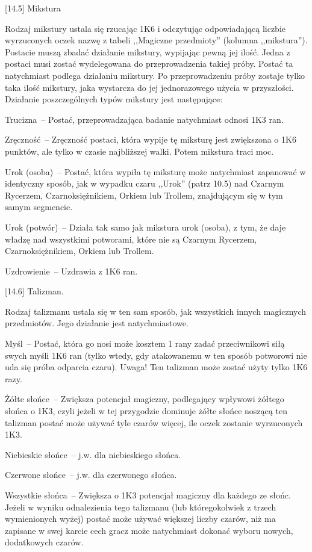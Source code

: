 [14.5] Mikstura

Rodzaj mikstury ustala się rzucając 1K6 i odczytując odpowiadającą liczbie wyrzuconych oczek nazwę z tabeli ,,Magiczne przedmioty'' (kolumna ,,mikstura'').
Postacie muszą zbadać działanie mikstury, wypijając pewną jej ilość.
Jedna z postaci musi zostać wydelegowana do przeprowadzenia takiej próby.
Postać ta natychmiast podlega działaniu mikstury.
Po przeprowadzeniu próby zostaje tylko taka ilość mikstury, jaka wystarcza do jej jednorazowego użycia w przyszłości.
Działanie poszczególnych typów mikstury jest następujące:

Trucizna~-- Postać, przeprowadzająca badanie natychmiast odnosi 1K3 ran.

Zręczność~-- Zręczność postaci, która wypije tę miksturę jest zwiększona o 1K6 punktów, ale tylko w czasie najbliższej walki.
Potem mikstura traci moc.

Urok (osoba)~-- Postać, która wypiła tę miksturę może natychmiast zapanować w identyczny sposób, jak w wypadku czaru ,,Urok'' (patrz 10.5) nad Czarnym Rycerzem, Czarnoksiężnikiem, Orkiem lub Trollem, znajdującym się w tym samym segmencie.

Urok (potwór)~-- Działa tak samo jak mikstura urok (osoba), z tym, że daje władzę nad wszystkimi potworami, które nie są Czarnym Rycerzem, Czarnoksiężnikiem, Orkiem lub Trollem.

Uzdrowienie~-- Uzdrawia z 1K6 ran.

[14.6] Talizman.

Rodzaj talizmanu ustala się w ten sam sposób, jak wszystkich innych magicznych przedmiotów.
Jego działanie jest natychmiastowe.

Myśl~-- Postać, która go nosi może kosztem 1 rany zadać przeciwnikowi siłą swych myśli 1K6 ran (tylko wtedy, gdy atakowanemu w ten sposób potworowi nie uda się próba odparcia czaru).
Uwaga! Ten talizman może zostać użyty tylko 1K6 razy.

Żółte słońce~-- Zwiększa potencjał magiczny, podlegający wpływowi żółtego słońca o 1K3, czyli jeżeli w tej przygodzie dominuje żółte słońce noszącą ten talizman postać może używać tyle czarów więcej, ile oczek zostanie wyrzuconych 1K3.

Niebieskie słońce~-- j.w. dla niebieskiego słońca.

Czerwone słońce~-- j.w. dla czerwonego słońca.

Wszystkie słońca~-- Zwiększa o 1K3 potencjał magiczny dla każdego ze słońc.
Jeżeli w wyniku odnalezienia tego talizmanu (lub któregokolwiek z trzech wymienionych wyżej) postać może używać większej liczby czarów, niż ma zapisane w swej karcie cech gracz może natychmiast dokonać wyboru nowych, dodatkowych czarów.

